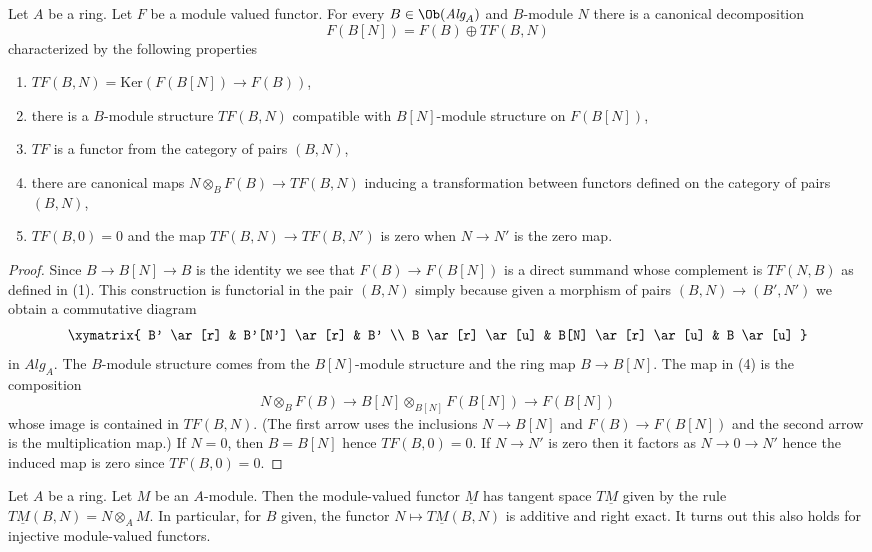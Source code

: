 \begin{lemma}
\label{lemma-tangent-functor}
Let $A$ be a ring. Let $F$ be a module valued functor.
For every $B \in \Ob(\textit{Alg}_A)$ and $B$-module $N$
there is a canonical decomposition
$$
F(B[N]) = F(B) \oplus TF(B, N)
$$
characterized by the following properties
\begin{enumerate}
\item $TF(B, N) = \text{Ker}(F(B[N]) \to F(B))$,
\item there is a $B$-module structure $TF(B, N)$
compatible with $B[N]$-module structure on $F(B[N])$,
\item $TF$ is a functor from the category of pairs $(B, N)$,
\item
\label{item-mult-map}
there are canonical maps $N \otimes_B F(B) \to TF(B, N)$
inducing a transformation between functors defined on the category
of pairs $(B, N)$,
\item $TF(B, 0) = 0$ and the map $TF(B, N) \to TF(B, N')$ is
zero when $N \to N'$ is the zero map.
\end{enumerate}
\end{lemma}

\begin{proof}
Since $B \to B[N] \to B$ is the identity we see that $F(B) \to F(B[N])$
is a direct summand whose complement is $TF(N, B)$ as defined in (1).
This construction is functorial in the pair $(B, N)$ simply because
given a morphism of pairs $(B, N) \to (B', N')$ we obtain a commutative
diagram
$$
\xymatrix{
B' \ar[r] & B'[N'] \ar[r] & B' \\
B \ar[r] \ar[u] & B[N] \ar[r] \ar[u] & B \ar[u]
}
$$
in $\textit{Alg}_A$. The $B$-module structure comes from the $B[N]$-module
structure and the ring map $B \to B[N]$. The map in (4) is the
composition
$$
N \otimes_B F(B) \longrightarrow
B[N] \otimes_{B[N]} F(B[N]) \longrightarrow F(B[N])
$$
whose image is contained in $TF(B, N)$. (The first arrow uses the inclusions
$N \to B[N]$ and $F(B) \to F(B[N])$ and the second arrow is the multiplication
map.) If $N = 0$, then $B = B[N]$
hence $TF(B, 0) = 0$. If $N \to N'$ is zero then it factors as
$N \to 0 \to N'$ hence the induced map is zero since $TF(B, 0) = 0$.
\end{proof}

\noindent
Let $A$ be a ring. Let $M$ be an $A$-module. Then the module-valued functor
$\underline{M}$ has tangent space $T\underline{M}$ given by the rule
$T\underline{M}(B, N) = N \otimes_A M$. In particular, for $B$ given, the
functor $N \mapsto T\underline{M}(B, N)$ is additive and right exact. It turns
out this also holds for injective module-valued functors.

